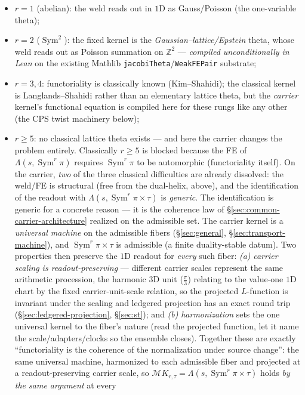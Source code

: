 \documentclass[11pt]{article}
\theoremstyle{definition}
\newcommand{\Sym}{\operatorname{Sym}}
\begin{document}
\begin{itemize}
\item $r=1$ (abelian): the weld reads out in $1$D as Gauss/Poisson (the one-variable theta);
\item $r=2$ ($\Sym^2$): the fixed kernel is the \emph{Gaussian--lattice/Epstein} theta, whose
weld reads out as Poisson summation on $\mathbb Z^2$ --- \emph{compiled unconditionally in Lean}
on the existing Mathlib \texttt{jacobiTheta}/\texttt{WeakFEPair} substrate;
\item $r=3,4$: functoriality is classically known (Kim--Shahidi); the classical kernel is
Langlands--Shahidi rather than an elementary lattice theta, but the \emph{carrier} kernel's
functional equation is compiled here for these rungs like any other (the CPS twist machinery below);
\item $r\ge5$: no classical lattice theta exists --- and here the carrier changes the problem
entirely. Classically $r\ge5$ is blocked because the FE of $\Lambda(s,\Sym^r\pi)$ requires
$\Sym^r\pi$ to be automorphic (functoriality itself). On the carrier, \emph{two} of the three
classical difficulties are already dissolved: the weld/FE is structural (free from the dual-helix,
above), and the identification of the readout with $\Lambda(s,\Sym^r\pi\times\tau)$ is
\emph{generic}. The identification is generic for a concrete reason --- it is the coherence law of
\S\ref{sec:common-carrier-architecture} realized on the admissible set. The carrier kernel is a
\emph{universal machine} on the admissible fibers (\S\ref{sec:general},
\S\ref{sec:transport-machine}), and $\Sym^r\pi\times\tau$ is admissible (a finite duality-stable
datum). Two properties then preserve the $1$D readout for \emph{every} such fiber:
\emph{(a)} \emph{carrier scaling is readout-preserving} --- different carrier scales represent the
same arithmetic procession, the harmonic $3$D unit ($\tfrac{\pi}{3}$) relating to the value-one
$1$D chart by the fixed carrier-unit-scale relation, so the projected $L$-function is invariant
under the scaling and ledgered projection has an exact round trip
(\S\ref{sec:ledgered-projection}, \S\ref{sec:st}); and \emph{(b)} \emph{harmonization} sets the one
universal kernel to the fiber's nature (read the projected function, let it name the
scale/adapters/clocks so the ensemble closes). Together these are exactly
``functoriality is the coherence of the normalization under source change'': the same universal
machine, harmonized to each admissible fiber and projected at a readout-preserving carrier scale,
so
$\mathcal M K_{r,\tau}=\Lambda(s,\Sym^r\pi\times\tau)$ holds \emph{by the same argument} at every

\end{itemize}
\end{document}
